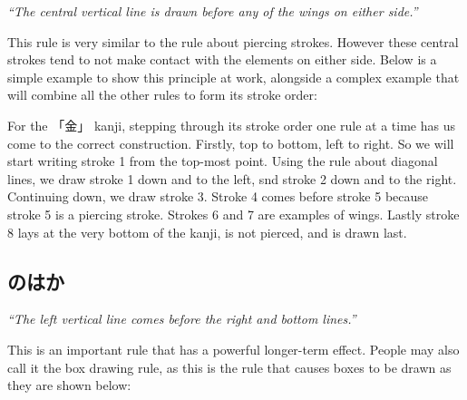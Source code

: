\hspace*{24pt}\textit{``The central vertical line is drawn before any of the wings on either side.''}

This rule is very similar to the rule about piercing strokes. However these central strokes tend to not make contact with the elements on either side. Below is a simple example to show this principle at work, alongside a complex example that will combine all the other rules to form its stroke order:

\begin{figure}[H]\label{fig:PR;漢字;書き順;中心の縦線は右左の翼より前に書く}
	\centering
	
	\hspace{0.5in}
	
\end{figure}

For the 「金」 kanji, stepping through its stroke order one rule at a time has us come to the correct construction. Firstly, top to bottom, left to right. So we will start writing stroke 1 from the top-most point. Using the rule about diagonal lines, we draw stroke 1 down and to the left, snd stroke 2 down and to the right. Continuing down, we draw stroke 3. Stroke 4 comes before stroke 5 because stroke 5 is a piercing stroke. Strokes 6 and 7 are examples of wings. Lastly stroke 8 lays at the very bottom of the kanji, is not pierced, and is drawn last.


\subsection*{のはか}\label{ssec:PR;漢字;書き順;左の縦線は右か下線の前}

\hspace*{24pt}\textit{``The left vertical line comes before the right and bottom lines.''}

This is an important rule that has a powerful longer-term effect. People may also call it the box drawing rule, as this is the rule that causes boxes to be drawn as they are shown below:

\begin{figure}[H]\label{fig:PR;漢字;書き順;左の縦線は右か下線の前;口}
	\centering
	
	\hspace{0.5in}
	
\end{figure}

